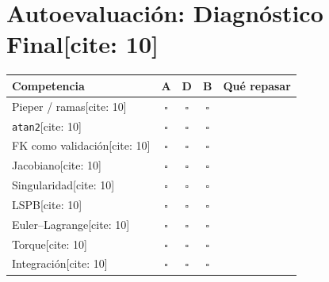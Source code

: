 \documentclass[11pt, a4paper]{article}
\begin{document}
\section*{Autoevaluación: Diagnóstico Final[cite: 10]}
\begin{center}
\renewcommand{\arraystretch}{1.5}
\begin{tabularx}{0.8\textwidth}{|X|c|c|c|>{\raggedright\arraybackslash}p{4cm}|}
\hline
\rowcolor{ucbblue!10} \textbf{Competencia} & \textbf{A} & \textbf{D} & \textbf{B} & \textbf{Qué repasar} \\ \hline
Pieper / ramas[cite: 10] & $\square$ & $\square$ & $\square$ & \\ \hline
\texttt{atan2}[cite: 10] & $\square$ & $\square$ & $\square$ & \\ \hline
FK como validación[cite: 10] & $\square$ & $\square$ & $\square$ & \\ \hline
Jacobiano[cite: 10] & $\square$ & $\square$ & $\square$ & \\ \hline
Singularidad[cite: 10] & $\square$ & $\square$ & $\square$ & \\ \hline
LSPB[cite: 10] & $\square$ & $\square$ & $\square$ & \\ \hline
Euler–Lagrange[cite: 10] & $\square$ & $\square$ & $\square$ & \\ \hline
Torque[cite: 10] & $\square$ & $\square$ & $\square$ & \\ \hline
Integración[cite: 10] & $\square$ & $\square$ & $\square$ & \\ \hline
\end{tabularx}
\end{center}
\end{document}
